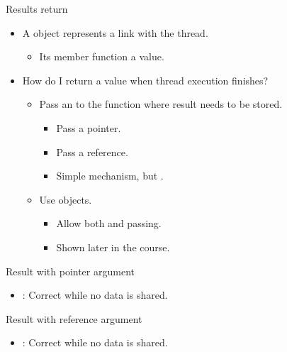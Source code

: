 \begin{frame}[t,fragile]{Results return}
\begin{itemize}
  \item A  object represents a link with the thread.
    \begin{itemize}
      \item Its  member function  a value.
    \end{itemize}

  \item How do I return a value when thread execution finishes?
    \begin{itemize}
      \item Pass an  to the function where result needs to be stored.
        \begin{itemize}
          \item Pass a pointer.
          \item Pass a reference.
          \item Simple mechanism, but .
        \end{itemize}
      \item Use  objects.
        \begin{itemize}
          \item Allow both  and  passing.
          \item Shown later in the course.
        \end{itemize}
    \end{itemize}
\end{itemize}
\end{frame}

\begin{frame}[t,fragile]{Result with pointer argument}

\begin{itemize}
  \item {}: 
        Correct while no data is shared.
\end{itemize}
\end{frame}

\begin{frame}[t,fragile]{Result with reference argument}

\begin{itemize}
  \item {}: 
        Correct while no data is shared.
\end{itemize}
\end{frame}

